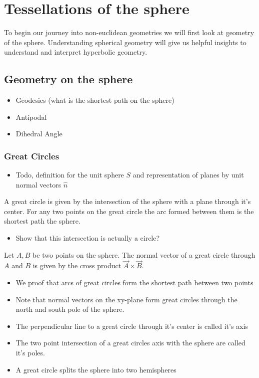 \section{Tessellations of the sphere}\label{tessellations-of-the-sphere}

To begin our journey into non-euclidean geometries we will first look at
geometry of the sphere. Understanding spherical geometry will give us
helpful insights to understand and interpret hyperbolic geometry.

\subsection{Geometry on the sphere}\label{geometry-on-the-sphere}

\begin{itemize}
\tightlist
\item[$\square$]
  Geodesics (what is the shortest path on the sphere)
\item[$\square$]
  Antipodal
\item[$\square$]
  Dihedral Angle
\end{itemize}

\subsubsection{Great Circles}\label{great-circles}

\begin{itemize}
\tightlist
\item[$\square$]
  Todo, definition for the unit sphere \(S\) and representation of
  planes by unit normal vectors \(\hat n\)
\end{itemize}

A great circle is given by the intersection of the sphere with a plane
through it's center. For any two points on the great circle the arc
formed between them is the shortest path the sphere.

\begin{itemize}
\tightlist
\item[$\square$]
  Show that this intersection is actually a circle?
\end{itemize}

Let \(A, B\) be two points on the sphere. The normal vector of a great
circle through \(A\) and \(B\) is given by the cross product
\(\vec{A} \times \vec{B}\).

\begin{itemize}
\tightlist
\item[$\square$]
  We proof that arcs of great circles form the shortest path between two
  points
\item[$\square$]
  Note that normal vectors on the xy-plane form great circles through
  the north and south pole of the sphere.
\item[$\square$]
  The perpendicular line to a great circle through it's center is called
  it's axis
\item[$\square$]
  The two point intersection of a great circles axis with the sphere are
  called it's poles.
\item[$\square$]
  A great circle splits the sphere into two hemispheres
\end{itemize}

